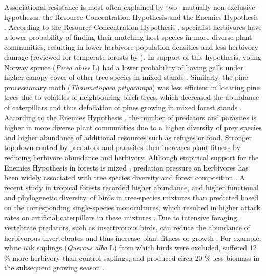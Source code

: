 \documentclass[10pt, twoside]{book} %
\begin{document}
	Associational resistance is most often explained by two --mutually non-exclusive-- hypotheses: the Resource Concentration Hypothesis and the Enemies Hypothesis \citep{Jactel2007}. According to the Resource Concentration Hypothesis \citep{Root1973}, specialist herbivores have a lower probability of finding their matching host species in more diverse plant communities, resulting in lower herbivore population densities and less herbivory damage (reviewed for temperate forests by \citealt{Castagneyrol2014, Jactel2005}). In support of this hypothesis, young Norway spruce (\textit{Picea abies} L) had a lower probability of having galls under higher canopy cover of other tree species in mixed stands \citep{Muiruri2017}. Similarly, the pine processionary moth (\textit{Thaumetopoea pityocampa}) was less efficient in locating pine trees due to volatiles of neighbouring birch trees, which decreased the abundance of caterpillars and thus defoliation of pines growing in mixed forest stands \citep{Jactel2011}. According to the Enemies Hypothesis \citep{Letourneau1987, Root1973, Russell1989}, the number of predators and parasites is higher in more diverse plant communities due to a higher diversity of prey species and higher abundance of additional resources such as refuges or food. Stronger top-down control by predators and parasites then increases plant fitness by reducing herbivore abundance and herbivory. Although empirical support for the Enemies Hypothesis in forests is mixed \citep{Grossman2018, Zhang2011}, predation pressure on herbivores has been widely associated with tree species diversity and forest composition \citep{Giffard2012, Muiruri2016, Yang2018}. A recent study in tropical forests recorded higher abundance, and higher functional and phylogenetic diversity, of birds in tree-species mixtures than predicted based on the corresponding single-species monocultures, which resulted in higher attack rates on artificial caterpillars in these mixtures \citep{Nell2018}. Due to intensive foraging, vertebrate predators, such as insectivorous birds, can reduce the abundance of herbivorous invertebrates and thus increase plant fitness or growth \citep{Mantyla2011, Mooney2010, Schmitz2000}. For example, white oak saplings (\textit{Quercus alba} L) from which birds were excluded, suffered 12 \% more herbivory than control saplings, and produced circa 20 \% less biomass in the subsequent growing season \citep{Marquis1994}.\\
	 
\end{document}
